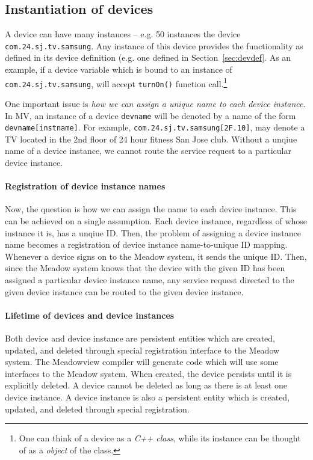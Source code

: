 \documentclass{note}
\begin{document}
\subsection{Instantiation of devices}
A device can have many instances -- e.g. 50 instances
the device \verb+com.24.sj.tv.samsung+.
Any instance of this device provides the functionality as defined 
in its device definition (e.g. one defined in Section~\ref{sec:devdef}.
As an example, if a device variable which is bound to an instance of
\verb+com.24.sj.tv.samsung+, will 
accept \verb+turnOn()+ function call.\footnote{One can think of a device as a
  {\em C++ class\/}, while its instance can be
thought of as a {\em object\/} of the class.}

One important issue is {\em how we can assign a unique name to each device
instance\/}. In MV, an instance of a device \verb+devname+ will be denoted by
a name of the form \verb+devname[instname]+.  For example,
\verb+com.24.sj.tv.samsung[2F.10]+, may denote a TV located in the 2nd 
floor of 24 hour fitness San Jose club. Without a unqiue name of a device
instance, we cannot route the service request to a particular device instance.

\paragraph{Registration of device instance names}
Now, the question is how we can assign the name to each device instance.
This can be achieved on a single assumption. Each device instance, regardless
of whose instance it is, has a unqiue ID. Then, the problem of assigning a
device instance name becomes a registration of device instance name-to-unique
ID mapping.  Whenever a device signs on to the Meadow system, it sends the
unique ID. Then, since the Meadow system knows that the device with the given
ID has been assigned a particular device instance name, any service request
directed to the given device instance can be routed to the given device
instance. 


\paragraph{Lifetime of devices and device instances}
Both device and device instance are persistent entities which are created,
updated, and deleted through special registration interface to the Meadow
system. The Meadowview compiler will generate code which will use some
interfaces to the Meadow system.
When created, the device persists until it is explicitly deleted. 
A device cannot be deleted as long as there is at least one device instance.
A device instance is also a persistent entity which is created, updated, and
deleted through special registration. 
\end{document}
